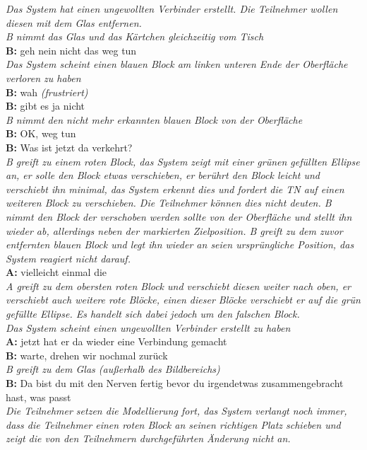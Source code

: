 \begin{transkript}
\emph{Das System hat einen ungewollten Verbinder erstellt. Die Teilnehmer wollen diesen mit dem Glas entfernen.} \\
\emph{B nimmt das Glas und das Kärtchen gleichzeitig vom Tisch} \\
\textbf{B:} geh nein nicht das weg tun \\
\emph{Das System scheint einen blauen Block am linken unteren Ende der Oberfläche verloren zu haben} \\
\textbf{B:} wah \emph{(frustriert)} \\
\textbf{B:} gibt es ja nicht \\
\emph{B nimmt den nicht mehr erkannten blauen Block von der Oberfläche} \\
\textbf{B:} OK, weg tun \\
\textbf{B:} Was ist jetzt da verkehrt? \\
\emph{B greift zu einem roten Block, das System zeigt mit einer grünen gefüllten Ellipse an, er solle den Block etwas verschieben, er berührt den Block leicht und verschiebt ihn minimal, das System erkennt dies und fordert die TN auf einen weiteren Block zu verschieben. Die Teilnehmer können dies nicht deuten. B nimmt den Block der verschoben werden sollte von der Oberfläche und stellt ihn wieder ab, allerdings neben der markierten Zielposition. B greift zu dem zuvor entfernten blauen Block und legt ihn wieder an seien ursprüngliche Position, das System reagiert nicht darauf.} \\
\textbf{A:} vielleicht einmal die \\
\emph{A greift zu dem obersten roten Block und verschiebt diesen weiter nach oben, er verschiebt auch weitere rote Blöcke, einen dieser Blöcke verschiebt er auf die grün gefüllte Ellipse. Es handelt sich dabei jedoch um den falschen Block.} \\
\emph{Das System scheint einen ungewollten Verbinder erstellt zu haben} \\
\textbf{A:} jetzt hat er da wieder eine Verbindung gemacht \\
\textbf{B:} warte, drehen wir nochmal zurück \\
\emph{B greift zu dem Glas (außerhalb des Bildbereichs)} \\
\textbf{B:} Da bist du mit den Nerven fertig bevor du irgendetwas zusammengebracht hast, was passt \\
\emph{Die Teilnehmer setzen die Modellierung fort, das System verlangt noch immer, dass die Teilnehmer einen roten Block an seinen richtigen Platz schieben und zeigt die von den Teilnehmern durchgeführten Änderung nicht an.} \\
\end{transkript}

